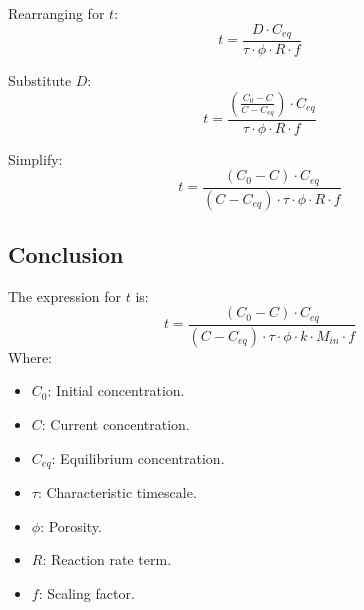 Rearranging for $t$:
\[
t = \frac{D \cdot C_{eq}}{\tau \cdot \phi \cdot R \cdot f}
\]

Substitute $D$:
\[
t = \frac{\left(\frac{C_0 - C}{C - C_{eq}}\right) \cdot C_{eq}}{\tau \cdot \phi \cdot R \cdot f}
\]

Simplify:
\[
t = \frac{(C_0 - C) \cdot C_{eq}}{(C - C_{eq}) \cdot \tau \cdot \phi \cdot R \cdot f}
\]

\subsection{Conclusion}
The expression for $t$ is:
\[
t = \frac{(C_0 - C) \cdot C_{eq}}{(C - C_{eq}) \cdot \tau \cdot \phi \cdot k \cdot M_{in} \cdot f}
\]
Where:
\begin{itemize}
    \item $C_0$: Initial concentration.
    \item $C$: Current concentration.
    \item $C_{eq}$: Equilibrium concentration.
    \item $\tau$: Characteristic timescale.
    \item $\phi$: Porosity.
    \item $R$: Reaction rate term.
    \item $f$: Scaling factor.
\end{itemize}
